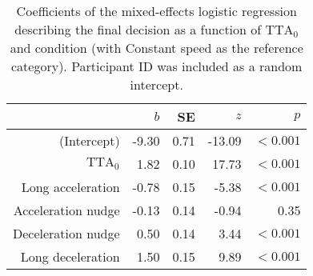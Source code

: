 \begin{table}[h]
\centering
\caption{Coefficients of the mixed-effects logistic regression describing the final decision as a function of $\textrm{TTA}_0$ and condition (with Constant speed as the reference category). Participant ID was included as a random intercept.}
\label{tab:decision}
\begin{tabular}{rrrrr}
\toprule
 & $b$ & SE & $z$ & $p$ \\
\midrule
(Intercept) & -9.30 & 0.71 & -13.09 & $<0.001$ \\
$\textrm{TTA}_0$ & 1.82 & 0.10 & 17.73 & $<0.001$ \\
Long acceleration & -0.78 & 0.15 & -5.38 & $<0.001$ \\
Acceleration nudge & -0.13 & 0.14 & -0.94 & 0.35 \\
Deceleration nudge & 0.50 & 0.14 & 3.44 & $<0.001$ \\
Long deceleration & 1.50 & 0.15 & 9.89 & $<0.001$ \\
\bottomrule
\end{tabular}
\end{table}
